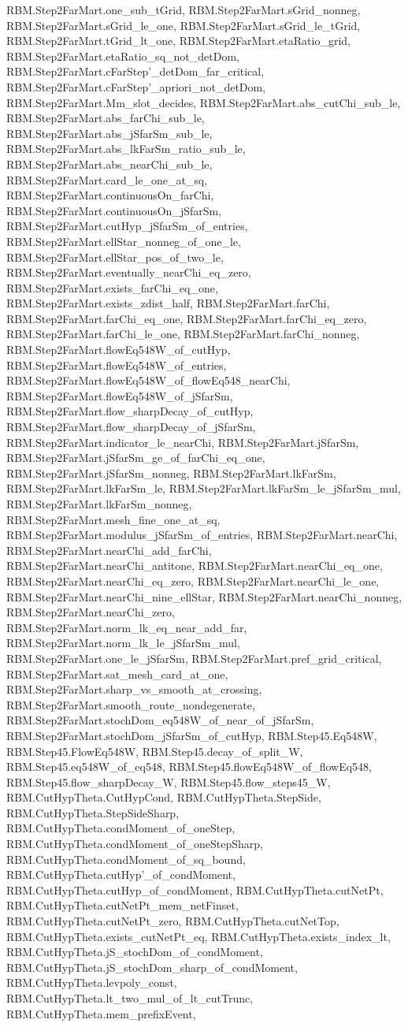 \begin{theorem}
RBM.Step2FarMart.one_sub_tGrid, RBM.Step2FarMart.sGrid_nonneg, RBM.Step2FarMart.sGrid_le_one, RBM.Step2FarMart.sGrid_le_tGrid, RBM.Step2FarMart.tGrid_lt_one, RBM.Step2FarMart.etaRatio_grid, RBM.Step2FarMart.etaRatio_sq_not_detDom, RBM.Step2FarMart.cFarStep'_detDom_far_critical, RBM.Step2FarMart.cFarStep'_apriori_not_detDom, RBM.Step2FarMart.Mm_slot_decides, RBM.Step2FarMart.abs_cutChi_sub_le, RBM.Step2FarMart.abs_farChi_sub_le, RBM.Step2FarMart.abs_jSfarSm_sub_le, RBM.Step2FarMart.abs_lkFarSm_ratio_sub_le, RBM.Step2FarMart.abs_nearChi_sub_le, RBM.Step2FarMart.card_le_one_at_sq, RBM.Step2FarMart.continuousOn_farChi, RBM.Step2FarMart.continuousOn_jSfarSm, RBM.Step2FarMart.cutHyp_jSfarSm_of_entries, RBM.Step2FarMart.ellStar_nonneg_of_one_le, RBM.Step2FarMart.ellStar_pos_of_two_le, RBM.Step2FarMart.eventually_nearChi_eq_zero, RBM.Step2FarMart.exists_farChi_eq_one, RBM.Step2FarMart.exists_zdist_half, RBM.Step2FarMart.farChi, RBM.Step2FarMart.farChi_eq_one, RBM.Step2FarMart.farChi_eq_zero, RBM.Step2FarMart.farChi_le_one, RBM.Step2FarMart.farChi_nonneg, RBM.Step2FarMart.flowEq548W_of_cutHyp, RBM.Step2FarMart.flowEq548W_of_entries, RBM.Step2FarMart.flowEq548W_of_flowEq548_nearChi, RBM.Step2FarMart.flowEq548W_of_jSfarSm, RBM.Step2FarMart.flow_sharpDecay_of_cutHyp, RBM.Step2FarMart.flow_sharpDecay_of_jSfarSm, RBM.Step2FarMart.indicator_le_nearChi, RBM.Step2FarMart.jSfarSm, RBM.Step2FarMart.jSfarSm_ge_of_farChi_eq_one, RBM.Step2FarMart.jSfarSm_nonneg, RBM.Step2FarMart.lkFarSm, RBM.Step2FarMart.lkFarSm_le, RBM.Step2FarMart.lkFarSm_le_jSfarSm_mul, RBM.Step2FarMart.lkFarSm_nonneg, RBM.Step2FarMart.mesh_fine_one_at_sq, RBM.Step2FarMart.modulus_jSfarSm_of_entries, RBM.Step2FarMart.nearChi, RBM.Step2FarMart.nearChi_add_farChi, RBM.Step2FarMart.nearChi_antitone, RBM.Step2FarMart.nearChi_eq_one, RBM.Step2FarMart.nearChi_eq_zero, RBM.Step2FarMart.nearChi_le_one, RBM.Step2FarMart.nearChi_nine_ellStar, RBM.Step2FarMart.nearChi_nonneg, RBM.Step2FarMart.nearChi_zero, RBM.Step2FarMart.norm_lk_eq_near_add_far, RBM.Step2FarMart.norm_lk_le_jSfarSm_mul, RBM.Step2FarMart.one_le_jSfarSm, RBM.Step2FarMart.pref_grid_critical, RBM.Step2FarMart.sat_mesh_card_at_one, RBM.Step2FarMart.sharp_vs_smooth_at_crossing, RBM.Step2FarMart.smooth_route_nondegenerate, RBM.Step2FarMart.stochDom_eq548W_of_near_of_jSfarSm, RBM.Step2FarMart.stochDom_jSfarSm_of_cutHyp, RBM.Step45.Eq548W, RBM.Step45.FlowEq548W, RBM.Step45.decay_of_split_W, RBM.Step45.eq548W_of_eq548, RBM.Step45.flowEq548W_of_flowEq548, RBM.Step45.flow_sharpDecay_W, RBM.Step45.flow_steps45_W, RBM.CutHypTheta.CutHypCond, RBM.CutHypTheta.StepSide, RBM.CutHypTheta.StepSideSharp, RBM.CutHypTheta.condMoment_of_oneStep, RBM.CutHypTheta.condMoment_of_oneStepSharp, RBM.CutHypTheta.condMoment_of_sq_bound, RBM.CutHypTheta.cutHyp'_of_condMoment, RBM.CutHypTheta.cutHyp_of_condMoment, RBM.CutHypTheta.cutNetPt, RBM.CutHypTheta.cutNetPt_mem_netFinset, RBM.CutHypTheta.cutNetPt_zero, RBM.CutHypTheta.cutNetTop, RBM.CutHypTheta.exists_cutNetPt_eq, RBM.CutHypTheta.exists_index_lt, RBM.CutHypTheta.jS_stochDom_of_condMoment, RBM.CutHypTheta.jS_stochDom_sharp_of_condMoment, RBM.CutHypTheta.levpoly_const, RBM.CutHypTheta.lt_two_mul_of_lt_cutTrunc, RBM.CutHypTheta.mem_prefixEvent, 
\end{theorem}
